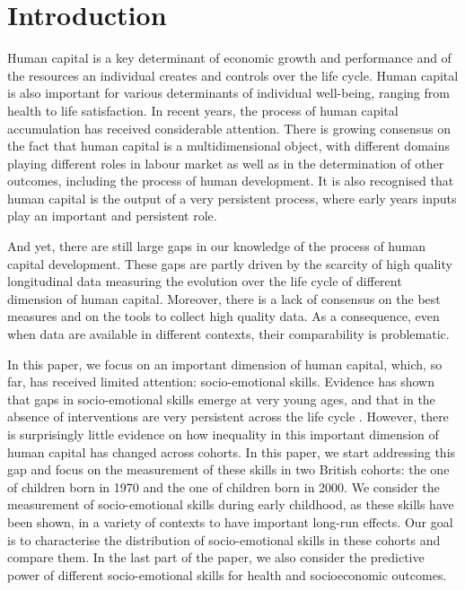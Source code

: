\section{Introduction}

Human capital is a key determinant of economic growth and performance and of the resources an individual creates and controls over the life cycle. Human capital is also important for various determinants of individual well-being, ranging from health to life satisfaction.  In recent years, the process of human capital accumulation has received considerable attention. There is growing consensus on the fact that human capital is a multidimensional object, with different domains playing different roles in labour market as well as in the determination of other outcomes, including the process of human development. It is also recognised that human capital is the output of a very persistent process, where early years inputs play an important and persistent role.

And yet, there are still large gaps in our knowledge of the process of human capital development. These gaps are partly driven by the scarcity of high quality longitudinal data measuring the evolution over the life cycle of different dimension of human capital. Moreover, there is a lack of consensus on the best measures and on the tools to collect high quality data. As a consequence, even when data are available in different contexts, their comparability is problematic.

In this paper, we focus on an important dimension of human capital, which, so far, has received limited attention: socio-emotional skills. Evidence has shown that gaps in socio-emotional skills emerge at very young ages, and that in the absence of interventions are very persistent across the life cycle \citep{cunha2006interpreting}. However, there is surprisingly little evidence on how inequality in this important dimension of human capital has changed across cohorts. In this paper, we start addressing this gap and focus on the measurement of these skills in two British cohorts: the one of children born in 1970 and the one of children born in 2000. We consider the measurement of socio-emotional skills during early childhood, as these skills have been shown, in a variety of contexts \citep{almlund2011personality} to have important long-run effects. Our goal is to characterise the distribution of socio-emotional skills in these cohorts and compare them. In the last part of the paper, we also consider the predictive power of different socio-emotional skills for health and socioeconomic outcomes.

